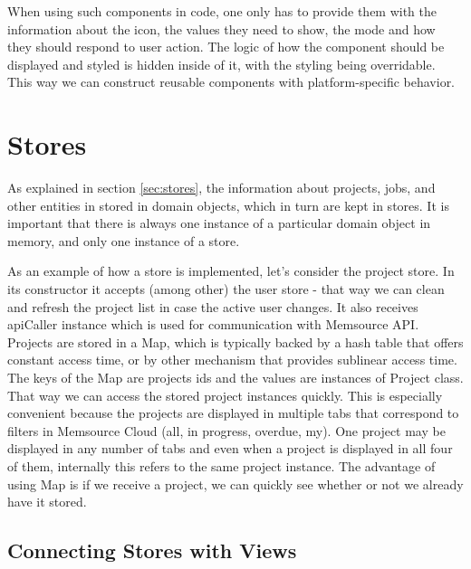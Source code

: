 When using such components in code, one only has to provide them with the information about the icon, the values they need to show, the mode and how they should respond to user action. The logic of how the component should be displayed and styled is hidden inside of it, with the styling being overridable. This way we can construct reusable components with platform-specific behavior.



\section{Stores}

As explained in section \ref{sec:stores}, the information about projects, jobs, and other entities in stored in domain objects, which in turn are kept in stores. It is important that there is always one instance of a particular domain object in memory, and only one instance of a store.

As an example of how a store is implemented, let's consider the project store. In its constructor it accepts (among other) the user store - that way we can clean and refresh the project list in case the active user changes. It also receives apiCaller instance which is used for communication with Memsource API. Projects are stored in a Map, which is typically backed by a hash table that offers constant access time, or by other mechanism that provides sublinear access time. The keys of the Map are projects ids and the values are instances of Project class. That way we can access the stored project instances quickly. This is especially convenient because the projects are displayed in multiple tabs that correspond to filters in Memsource Cloud (all, in progress, overdue, my). One project may be displayed in any number of tabs and even when a project is displayed in all four of them, internally this refers to the same project instance. The advantage of using Map is if we receive a project, we can quickly see whether or not we already have it stored.


\subsection{Connecting Stores with Views}


